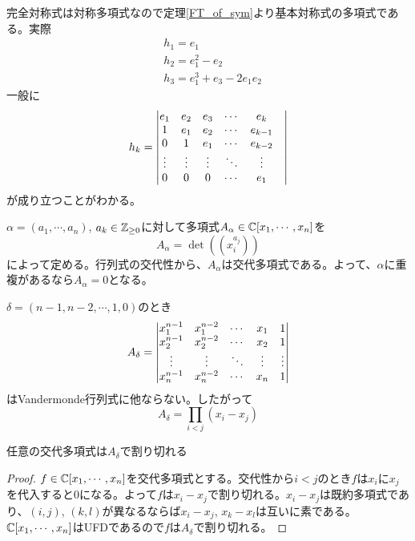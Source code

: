 \documentclass{ltjsarticle}
\begin{document}
\begin{eg}
    完全対称式は対称多項式なので定理\ref{FT_of_sym}より基本対称式の多項式である。実際
    \begin{align*}
        &h_1=e_1\\
        &h_2=e_1^2-e_2\\
        &h_3=e_1^3+e_3-2e_1e_2
    \end{align*}
    一般に
    \[
    h_k=\begin{vmatrix} e_1&e_2&e_3&\cdots&e_k\\
              1&e_1&e_2&\cdots&e_{k-1}\\
              0&1&e_1&\cdots&e_{k-2}\\
              \vdots&\vdots&\vdots&\ddots&\vdots&\\
              0&0&0&\cdots&e_1 \end{vmatrix}
    \]
    が成り立つことがわかる。
\end{eg}

\begin{defin}
    $\alpha=(a_1,\cdots,a_n)$, $a_k\in\mathbb{Z}_{\geq 0}$に対して多項式$A_\alpha\in\mathbb{C}[x_1,\cdots,x_n]$を
    \[
        A_\alpha=\det((x_i^{a_j}))
    \]
    によって定める。行列式の交代性から、$A_\alpha$は交代多項式である。よって、$\alpha$に重複があるなら$A_\alpha=0$となる。
\end{defin}

\begin{eg}
    $\delta=(n-1,n-2,\cdots,1,0)$のとき
    \[
        A_\delta=\begin{vmatrix} x_1^{n-1}&x_1^{n-2}&\cdots&x_1&1\\
                       x_2^{n-1}&x_2^{n-2}&\cdots&x_2&1\\
                       \vdots&\vdots&\ddots&\vdots&\vdots\\
                       x_n^{n-1}&x_n^{n-2}&\cdots&x_n&1 \end{vmatrix}
    \]
    はVandermonde行列式に他ならない。したがって
    \[
    A_\delta=\prod_{i<j}(x_i-x_j)    
    \]
\end{eg}

\begin{prop}\label{alter_poly}
    任意の交代多項式は$A_\delta$で割り切れる
\end{prop}

\begin{proof}
    $f\in\mathbb{C}[x_1,\cdots,x_n]$を交代多項式とする。交代性から$i<j$のとき$f$は$x_i$に$x_j$を代入すると$0$になる。よって$f$は$x_i-x_j$で割り切れる。$x_i-x_j$は既約多項式であり、$(i,j)$, $(k,l)$が異なるならば$x_i-x_j$, $x_k-x_l$は互いに素である。$\mathbb{C}[x_1,\cdots,x_n]$はUFDであるので$f$は$A_\delta$で割り切れる。
\end{proof}
\end{document}
